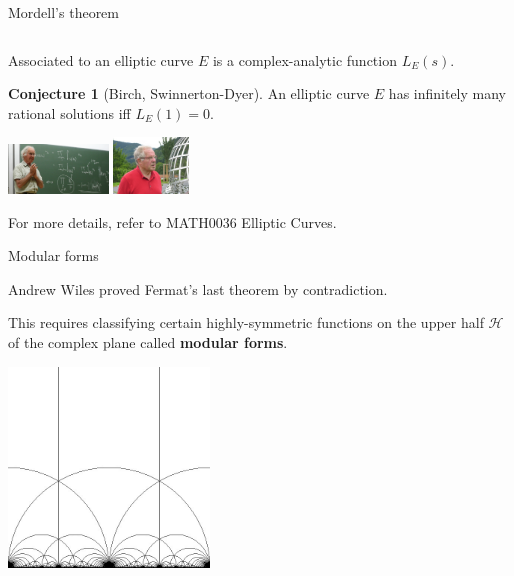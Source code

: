 \documentclass[10pt]{beamer}
\theoremstyle{definition}
\newtheorem{conjecture}{Conjecture}
\begin{document}
\begin{frame}[t]{Mordell's theorem}
\begin{columns}[T]
\end{columns}

\vspace{0.5cm}

Associated to an elliptic curve $ E $ is a complex-analytic function $ L_E(s) $.

\begin{conjecture}[Birch, Swinnerton-Dyer]
An elliptic curve $ E $ has infinitely many rational solutions iff $ L_E(1) = 0 $.
\end{conjecture}

\begin{center}
\includegraphics[width=0.2\textwidth]{birch.jpg}
\vspace{0.5cm}
\includegraphics[width=0.15\textwidth]{swinnertondyer.jpg}
\end{center}

For more details, refer to MATH0036 Elliptic Curves.

\end{frame}

\begin{frame}[t]{Modular forms}

Andrew Wiles proved Fermat's last theorem by contradiction.

\vspace{0.5cm} This requires classifying certain highly-symmetric functions on the upper half $ \mathcal{H} $ of the complex plane called \textbf{modular forms}.

\vspace{0.5cm}

\begin{center}
\includegraphics[width=0.4\textwidth]{modularform.jpg}
\end{center}

\end{frame}
\end{document}

